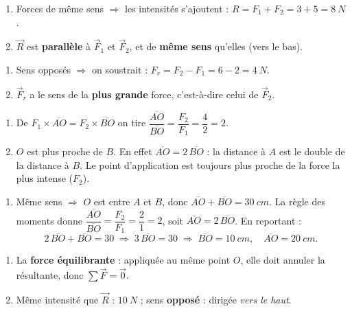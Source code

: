\documentclass[11pt,a4paper]{article}
\newcommand{\vv}[1]{\vec{#1}}\newcommand{\ds}{\displaystyle}
\begin{document}
\begin{corrige}
\begin{enumerate}[label=\alph*)]
  \item Forces de même sens $\Rightarrow$ les intensités s'ajoutent : $R = F_1+F_2 = 3+5 = \qty{8}{N}$.
  \item $\vv R$ est \textbf{parallèle} à $\vv F_1$ et $\vv F_2$, et de \textbf{même sens} qu'elles (vers le
        bas).
\end{enumerate}
\end{corrige}

\begin{corrige}
\begin{enumerate}[label=\alph*)]
  \item Sens opposés $\Rightarrow$ on soustrait : $F_r = F_2 - F_1 = 6 - 2 = \qty{4}{N}$.
  \item $\vv F_r$ a le sens de la \textbf{plus grande} force, c'est-à-dire celui de $\vv F_2$.
\end{enumerate}
\end{corrige}

\begin{corrige}
\begin{enumerate}[label=\alph*)]
  \item De $F_1\times\overline{AO}=F_2\times\overline{BO}$ on tire
        $\dfrac{\overline{AO}}{\overline{BO}} = \dfrac{F_2}{F_1} = \dfrac{4}{2} = 2$.
  \item $O$ est plus proche de \textbf{$B$}. En effet $\overline{AO}=2\,\overline{BO}$ : la distance à $A$
        est le double de la distance à $B$. Le point d'application est toujours plus proche de la force
        la plus intense ($F_2$).
\end{enumerate}
\end{corrige}

\begin{corrige}
\begin{enumerate}[label=\alph*)]
  \item Même sens $\Rightarrow$ $O$ est entre $A$ et $B$, donc $\overline{AO}+\overline{BO}=\qty{30}{cm}$.
        La règle des moments donne $\dfrac{\overline{AO}}{\overline{BO}}=\dfrac{F_2}{F_1}=\dfrac{2}{1}=2$,
        soit $\overline{AO}=2\,\overline{BO}$. En reportant :
        \[ 2\,\overline{BO}+\overline{BO}=30 \;\Rightarrow\; 3\,\overline{BO}=30
        \;\Rightarrow\; \overline{BO}=\qty{10}{cm},\quad \overline{AO}=\qty{20}{cm}. \]
\end{enumerate}
\end{corrige}

\begin{corrige}
\begin{enumerate}[label=\alph*)]
  \item La \textbf{force équilibrante} : appliquée au même point $O$, elle doit annuler la résultante,
        donc $\sum\vv F=\vv 0$.
  \item Même intensité que $\vv R$ : $\qty{10}{N}$ ; sens \textbf{opposé} : dirigée \emph{vers le haut}.
\end{enumerate}
\end{corrige}
\end{document}
